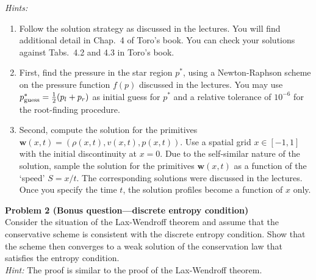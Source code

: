 \documentclass[letter,11pt]{article}
\begin{document}
\noindent\emph{Hints:}
\begin{enumerate}
  \item Follow the solution strategy as discussed in the lectures. You will find additional detail in Chap.~4 of Toro's book. You can check your solutions against Tabs.~4.2 and 4.3 in Toro's book.
  
  \item First, find the pressure in the star region $p^*$, using a Newton-Raphson scheme on the pressure function $f(p)$ discussed in the lectures. You may use $p^*_{\rm guess}=\frac{1}{2}(p_l + p_r)$ as initial guess for $p^*$ and a relative tolerance of $10^{-6}$ for the root-finding procedure.

  \item Second, compute the solution for the primitives $\mathbf{w}(x,t)=(\rho(x,t), v(x,t), p(x,t))$. Use a spatial grid $x\in [-1,1]$ with the initial discontinuity at $x=0$. Due to the self-similar nature of the solution, sample the solution for the primitives $\mathbf{w}(x,t)$ as a function of the `speed' $S=x/t$. The corresponding solutions were discussed in the lectures. Once you specify the time $t$, the solution profiles become a function of $x$ only.
\end{enumerate}




\newpage

\phantom{.}

{\noindent\large\textbf{Problem 2 (Bonus question---discrete entropy condition)}}\\

\noindent Consider the situation of the Lax-Wendroff theorem and assume that the conservative scheme is consistent with the discrete entropy condition. Show that the scheme then converges to a weak solution of the conservation law that satisfies the entropy condition.\\

\noindent\emph{Hint:} The proof is similar to the proof of the Lax-Wendroff theorem.
\end{document}
